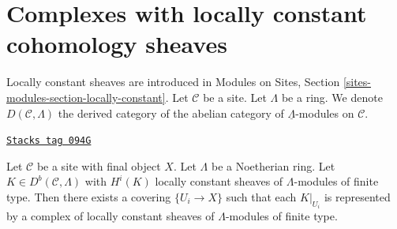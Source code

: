 \section{Complexes with locally constant cohomology sheaves}
\label{sites-cohomology-section-locally-constant}
Locally constant sheaves are introduced in
Modules on Sites, Section \ref{sites-modules-section-locally-constant}.
Let $\mathcal{C}$ be a site.
Let $\Lambda$ be a ring.
We denote $D(\mathcal{C}, \Lambda)$ the derived category of the
abelian category of $\underline{\Lambda}$-modules on $\mathcal{C}$.

\begin{lemma}
\label{sites-cohomology-lemma-locally-constant}
\href{https://stacks.math.columbia.edu/tag/094G}{\texttt{Stacks tag 094G}}

Let $\mathcal{C}$ be a site with final object $X$.
Let $\Lambda$ be a Noetherian ring.
Let $K \in D^b(\mathcal{C}, \Lambda)$
with $H^i(K)$ locally constant sheaves of $\Lambda$-modules
of finite type. Then there exists a covering $\{U_i \to X\}$
such that each $K|_{U_i}$ is represented by
a complex of locally constant sheaves of $\Lambda$-modules
of finite type.
\end{lemma}

